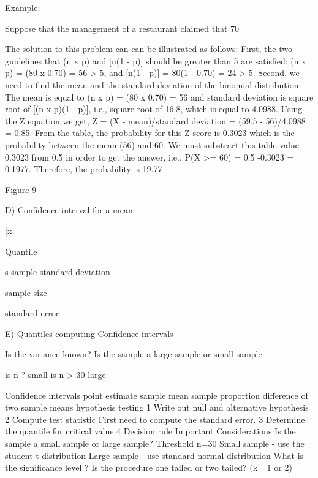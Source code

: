 Example:

Suppose that the management of a restaurant claimed that 70%

The solution to this problem can can be illustrated as follows:
First, the two guidelines that (n x p) and [n(1 - p)] should be greater than 5 are satisfied: (n x p) = (80 x 0.70) = 56 > 5, and [n(1 - p)] = 80(1 - 0.70) = 24 > 5. Second, we need to find the mean and the standard deviation of the binomial distribution. The mean is equal to (n x p) = (80 x 0.70) = 56 and standard deviation is square root of [(n x p)(1 - p)], i.e., square root of 16.8, which is equal to 4.0988. Using the Z equation we get, Z = (X - mean)/standard deviation = (59.5 - 56)/4.0988 = 0.85. From the table, the probability for this Z score is 0.3023 which is the probability between the mean (56) and 60. We must substract this table value 0.3023 from 0.5 in order to get the answer, i.e., P(X >= 60) = 0.5 -0.3023 = 0.1977. Therefore, the probability is 19.77%

Figure 9



D) Confidence interval for a mean

\bar{x}

Quantile

s sample standard deviation

sample size 

standard error  



E) Quantiles computing Confidence intervals

Is the variance known?
Is the sample a large sample or small sample

is n  ? small
is n > 30 large


Confidence intervals
point estimate 
sample mean
sample proportion
difference of two sample means
hypothesis testing
1 Write out null and alternative hypothesis
2 Compute test statistic 
	First need to compute the standard error.
3 Determine the quantile for critical value
4 Decision rule 
Important Considerations
Is the sample a small sample or large sample?
	Threshold n=30
		Small sample - use the student t distribution
		Large sample - use standard normal distribution
What is the significance level ? 
Is the procedure one tailed or two tailed? (k =1 or 2)

